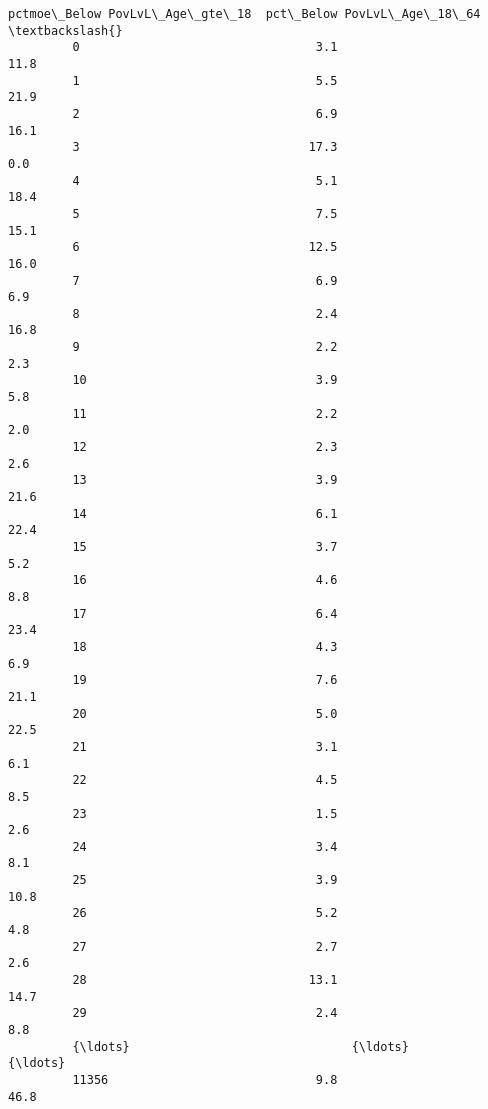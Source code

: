 \documentclass[11pt]{article}
\begin{document}
\begin{Verbatim}[commandchars=\\\{\}]
                pctmoe\_Below PovLvL\_Age\_gte\_18  pct\_Below PovLvL\_Age\_18\_64  \textbackslash{}
         0                                 3.1                        11.8   
         1                                 5.5                        21.9   
         2                                 6.9                        16.1   
         3                                17.3                         0.0   
         4                                 5.1                        18.4   
         5                                 7.5                        15.1   
         6                                12.5                        16.0   
         7                                 6.9                         6.9   
         8                                 2.4                        16.8   
         9                                 2.2                         2.3   
         10                                3.9                         5.8   
         11                                2.2                         2.0   
         12                                2.3                         2.6   
         13                                3.9                        21.6   
         14                                6.1                        22.4   
         15                                3.7                         5.2   
         16                                4.6                         8.8   
         17                                6.4                        23.4   
         18                                4.3                         6.9   
         19                                7.6                        21.1   
         20                                5.0                        22.5   
         21                                3.1                         6.1   
         22                                4.5                         8.5   
         23                                1.5                         2.6   
         24                                3.4                         8.1   
         25                                3.9                        10.8   
         26                                5.2                         4.8   
         27                                2.7                         2.6   
         28                               13.1                        14.7   
         29                                2.4                         8.8   
         {\ldots}                               {\ldots}                         {\ldots}   
         11356                             9.8                        46.8   

\end{Verbatim}
\end{document}

